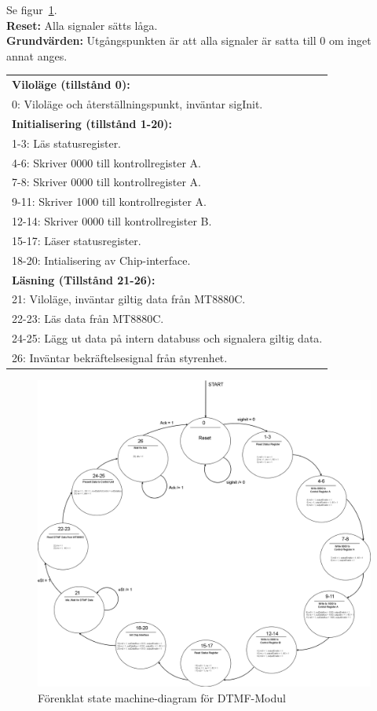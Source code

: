 \documentclass[a4paper,11pt]{article}
\begin{document}
			Se figur~\ref{fig:DTMFSM}.\\
			{\bf Reset:} Alla signaler sätts låga.\\
			{\bf Grundvärden:} Utgångspunkten är att alla signaler är satta till 0 om inget annat anges.\\
			\begin{tabular}{l}
				\\{\bf Viloläge (tillstånd 0):}\\
				0: Viloläge och återställningspunkt, inväntar sigInit.\\
				{\bf Initialisering (tillstånd 1-20):}\\
				1-3: Läs statusregister.\\
				4-6: Skriver 0000 till kontrollregister A.\\
				7-8: Skriver 0000 till kontrollregister A.\\
				9-11: Skriver 1000 till kontrollregister A.\\
				12-14: Skriver 0000 till kontrollregister B.\\
				15-17: Läser statusregister.\\
				18-20: Intialisering av Chip-interface.\\
				{\bf Läsning (Tillstånd 21-26):}\\
				21:  Viloläge, inväntar giltig data från MT8880C.\\
				22-23:  Läs data från MT8880C.\\
				24-25:  Lägg ut data på intern databuss och signalera giltig data.\\
				26:  Inväntar bekräftelsesignal från styrenhet.\\				
			\end{tabular}

	\begin{figure}[H]
	  \centering
	      \includegraphics[scale=0.18, angle=0]{DTMFStateMachineDiagram.png}		
	  	\caption{Förenklat state machine-diagram för DTMF-Modul}
		\label{fig:DTMFSM}
	\end{figure}
	
\end{document}
